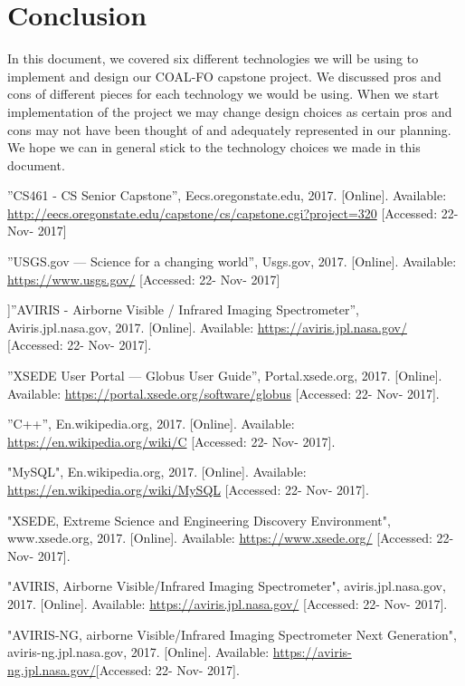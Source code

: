 \documentclass[10pt,draftclsnofoot,onecolumn,journal,compsoc]{IEEEtran}
\begin{document}
\section{Conclusion}

\noindent In this document, we covered six different technologies we will be using to implement and design our COAL-FO capstone project. We discussed pros and cons of different pieces for each technology we would be using. When we start implementation of the project we may change design choices as certain pros and cons may not have been thought of and adequately represented in our planning. We hope we can in general stick to the technology choices we made in this document.

\begin{thebibliography}{9}
 ”CS461 - CS Senior Capstone”, Eecs.oregonstate.edu, 2017. [Online]. Available: \url{http://eecs.oregonstate.edu/capstone/cs/capstone.cgi?project=320} [Accessed: 22- Nov- 2017]

 ”USGS.gov — Science for a changing world”, Usgs.gov, 2017. [Online]. Available: \url{https://www.usgs.gov/} [Accessed: 22- Nov- 2017]

 ]”AVIRIS - Airborne Visible / Infrared Imaging Spectrometer”, Aviris.jpl.nasa.gov, 2017. [Online]. Available:
\url{https://aviris.jpl.nasa.gov/} [Accessed: 22- Nov- 2017].

 ”XSEDE User Portal — Globus User Guide”, Portal.xsede.org, 2017. [Online]. Available: \url{https://portal.xsede.org/software/globus} [Accessed: 22- Nov- 2017].

 ”C++”, En.wikipedia.org, 2017. [Online]. Available:
\url{https://en.wikipedia.org/wiki/C} [Accessed: 22- Nov- 2017].

 "MySQL", En.wikipedia.org, 2017. [Online]. Available: \url{https://en.wikipedia.org/wiki/MySQL} [Accessed: 22- Nov- 2017].

 "XSEDE, Extreme Science and Engineering Discovery Environment", www.xsede.org, 2017. [Online]. Available: \url{https://www.xsede.org/} [Accessed: 22- Nov- 2017].

 "AVIRIS, Airborne Visible/Infrared Imaging Spectrometer", aviris.jpl.nasa.gov, 2017. [Online]. Available: \url{https://aviris.jpl.nasa.gov/} [Accessed: 22- Nov- 2017].

 "AVIRIS-NG, airborne Visible/Infrared Imaging Spectrometer Next Generation", aviris-ng.jpl.nasa.gov, 2017. [Online]. Available: \url{https://aviris-ng.jpl.nasa.gov/}[Accessed: 22- Nov- 2017].


\end{thebibliography}
\end{document}
